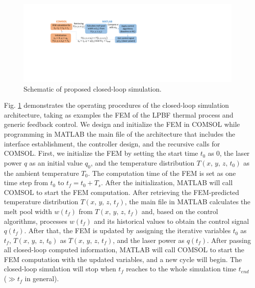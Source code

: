 \documentclass [11pt, proquest] {uwthesis}[2020/02/24]
\begin{document}
\begin{figure}[!ht]
\begin{centering}
\includegraphics[clip,width=13cm]{Closed-loop-simulation/closedloop_comsol_matlab_2}
\par\end{centering}
\centering{}\caption{\label{fig:Schematic-of-proposed}Schematic of proposed closed-loop
simulation.}
\end{figure}
Fig. \ref{fig:Schematic-of-proposed} demonstrates the operating procedures
of the closed-loop simulation architecture, taking as examples
the FEM of the LPBF thermal process and generic feedback control. We
design and initialize the FEM in COMSOL while programming in MATLAB
the main file of the architecture that includes the interface establishment,
the controller design, and the recursive calls for COMSOL. First,
we initialize the FEM by setting the start time $t_{0}$ as 0, the
laser power $q$ as an initial value $q_{0}$, and the temperature
distribution $T(x,\,y,\,z,\,t_{0})$ as the ambient temperature $T_{0}$.
The computation time of the FEM is set as one time step from $t_{0}$
to $t_{f}=t_{0}+T_{s}$. After the initialization, MATLAB will call
COMSOL to start the FEM computation. After retrieving the FEM-predicted
temperature distribution $T(x,\,y,\,z,\,t_{f})$, the main file in
MATLAB calculates the melt pool width $w(t_{f})$ from $T(x,\,y,\,z,\,t_{f})$
and, based on the control algorithms, processes $w(t_{f})$ and its
historical values to obtain the control signal $q(t_{f})$. After
that, the FEM is updated by assigning the iterative variables $t_{0}$
as $t_{f}$, $T(x,\,y,\,z,\,t_{0})$ as $T(x,\,y,\,z,\,t_{f})$, and
the laser power as $q(t_{f})$. After passing all closed-loop computed
information, MATLAB will call COMSOL to start the FEM computation
with the updated variables, and a new cycle will begin. The closed-loop
simulation will stop when $t_{f}$ reaches to the whole simulation
time $t_{end}$ ($\gg t_{f}$ in general).
\end{document}

